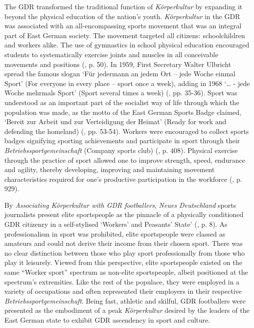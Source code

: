 The GDR transformed the traditional function of \textit{Körperkultur} by expanding it beyond the physical education of the nation’s youth. \textit{Körperkultur} in the GDR was associated with an all-encompassing sports movement that was an integral part of East German society. The movement targeted all citizens: schoolchildren and workers alike. The use of gymnastics in school physical education encouraged students to systematically exercise joints and muscles in all conceivable movements and positions (\cite{reinhartkrüger2007}, p. 50). In 1959, First Secretary Walter Ulbricht spread the famous slogan ‘Für jedermann an jedem Ort – jede Woche einmal Sport’ (For everyone in every place – sport once a week), adding in 1968 ‘… - jede Woche mehrmals Sport’ (Sport several times a week) (\cite{bernett1994}, pp. 35-36). Sport was understood as an important part of the socialist way of life through which the population was made, as the motto of the East German Sports Badge claimed, ‘Bereit zur Arbeit und zur Verteidigung der Heimat’ (Ready for work and defending the homeland) (\cite{reinhartkrüger2007}, pp. 53-54). Workers were encouraged to collect sports badges signifying sporting achievements and participate in sport through their \textit{Betriebssportgemeinschaft} (Company sports club) (\cite{grix2008}, p. 408). Physical exercise through the practice of sport allowed one to improve strength, speed, endurance and agility, thereby developing, improving and maintaining movement characteristics required for one’s productive participation in the workforce (\cite{sieger1964}, p. 929).

By \textit{Associating Körperkultur with GDR footballers}, \textit{Neues Deutschland} sports journalists present elite sportspeople as the pinnacle of a physically conditioned GDR citizenry in a self-stylised ‘Workers’ and Peasants’ State’ (\cite{majorosmond2002}, p. 8). As professionalism in sport was prohibited, elite sportspeople were classed as amateurs and could not derive their income from their chosen sport. There was no clear distinction between those who play sport professionally from those who play it leisurely. Viewed from this perspective, elite sportspeople existed on the same “Worker sport” spectrum as non-elite sportspeople, albeit positioned at the spectrum’s extremities. Like the rest of the populace, they were employed in a variety of occupations and often represented their employers in their respective \textit{Betriebssportgemeinschaft}. Being fast, athletic and skilful, GDR footballers were presented as the embodiment of a peak \textit{Körperkultur} desired by the leaders of the East German state to exhibit GDR ascendency in sport and culture.

